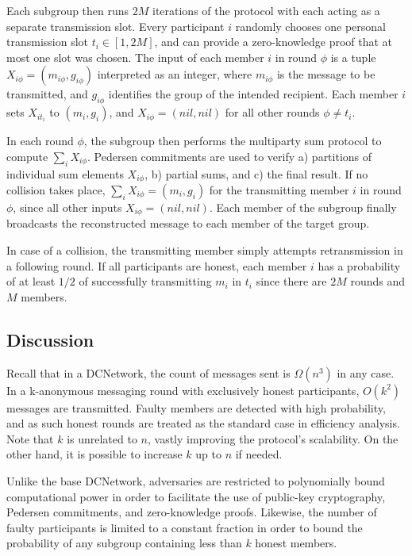 Each subgroup then runs $2M$ iterations of the protocol with each acting as a separate transmission slot.
Every participant $i$ randomly chooses one personal transmission slot $t_i \in [1, 2M]$,
and can provide a zero-knowledge
proof that at most one slot was chosen. The input of each member $i$ in round $\phi$ is
a tuple $X_{i\phi} = (m_{i\phi}, g_{i\phi})$ interpreted as an integer,
where $m_{i\phi}$ is the message to be transmitted, and
$g_{i\phi}$ identifies the group of the intended recipient. Each member $i$ sets $X_{it_i}$ to $(m_i, g_i)$,
and $X_{i\phi} = (nil, nil)$ for all other rounds $\phi \neq t_i$.

In each round $\phi$, the subgroup then performs the multiparty sum protocol to compute
$\sum_i X_{i\phi}$. Pedersen commitments are used to verify a) partitions of individual sum
elements $X_{i\phi}$, b) partial sums, and c) the final result. If no collision takes place,
$\sum_i X_{i\phi} = (m_i, g_i)$ for the transmitting member $i$ in round $\phi$, since all
other inputs $X_{i\phi} = (nil, nil)$. Each member of the subgroup finally broadcasts the
reconstructed message to each member of the target group. 

In case of a collision, the transmitting member simply
attempts retransmission in a following round. If all participants are honest,
each member $i$ has a probability of at least $1/2$ of successfully transmitting $m_i$
in $t_i$ since there are $2M$ rounds and $M$ members.

\subsection{Discussion}

Recall that in a \ac{DCNetwork}, the count of messages sent is $\Omega(n^3)$ in any case.
In a k-anonymous messaging round with exclusively honest participants, $O(k^2)$ messages are transmitted.
Faulty members are detected with high probability, and as such
honest rounds are treated as the standard case in efficiency analysis.
Note that $k$ is unrelated to $n$, vastly improving the protocol's scalability.
On the other hand, it is possible to increase $k$ up to $n$ if needed.

Unlike the base \ac{DCNetwork}, adversaries are restricted to polynomially bound computational
power in order to facilitate the use of public-key cryptography, Pedersen commitments, and zero-knowledge
proofs. Likewise, the number of faulty participants is limited to a constant fraction in order
to bound the probability of any subgroup containing less than $k$ honest members.

